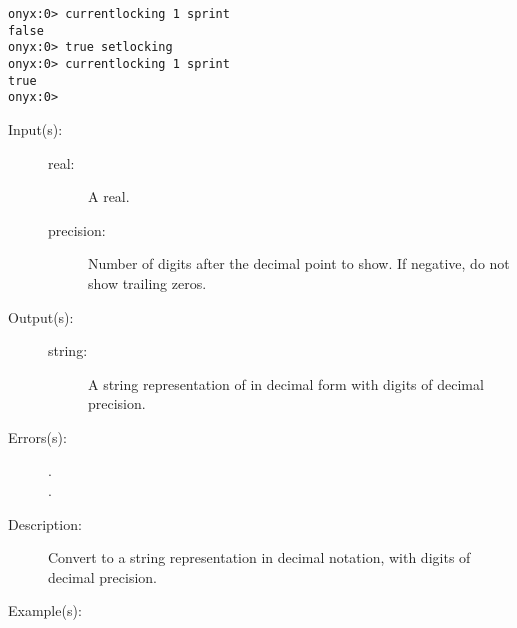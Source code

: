 \begin{description}
\begin{description}
\begin{verbatim}
onyx:0> currentlocking 1 sprint
false
onyx:0> true setlocking
onyx:0> currentlocking 1 sprint
true
onyx:0>
		\end{verbatim}
	\end{description}
\label{systemdict:cvds}
\item[{\onyxop{real precision}{cvds}{string}}: ]
	\begin{description}\item[]
	\item[Input(s): ]
		\begin{description}\item[]
		\item[real: ]
			A real.
		\item[precision: ]
			Number of digits after the decimal point to show.  If
			negative, do not show trailing zeros.
		\end{description}
	\item[Output(s): ]
		\begin{description}\item[]
		\item[string: ]
			A string representation of  in decimal form
			with  digits of decimal precision.
		\end{description}
	\item[Errors(s): ]
		\begin{description}\item[]
		\item[.]
		\item[.]
		\end{description}
	\item[Description: ]
		Convert  to a string representation in decimal
		notation, with  digits of decimal precision.
	\item[Example(s): ]\begin{verbatim}


\end{verbatim}
\end{description}
\end{description}
